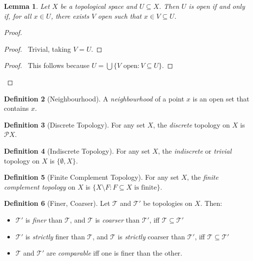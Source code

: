 \documentclass{book}
\newtheorem{lm}{Lemma}[chapter]
\theoremstyle{definition}
\newtheorem{df}[lm]{Definition}
\begin{document}
  \begin{lm}
    \label{lm:topology:open:membership}
    Let $X$ be a topological space and $U \subseteq X$. Then $U$ is open if and 
    only if, for all $x \in U$, there exists $V$ open such that $x \in V 
    \subseteq 
    U$.
  \end{lm}
  
  \begin{proof}
    \pf
    \begin{proof}
      \pf\ Trivial, taking $V = U$.
    \end{proof}
    \begin{proof}
      \pf\ This follows because $U = \bigcup \{ V \text{ open} : V \subseteq U 
      \}$.
    \end{proof}
  \end{proof}
  
  \begin{df}[Neighbourhood]
    A \emph{neighbourhood} of a point $x$ is an open set that contains $x$.
  \end{df}
  
  \begin{df}[Discrete Topology]
    For any set $X$, the \emph{discrete} topology on $X$ is $\mathcal{P} X$.
  \end{df}
  
  \begin{df}[Indiscrete Topology]
    For any set $X$, the \emph{indiscrete} or \emph{trivial} topology on $X$ is
    $\{ \emptyset, X \}$.
  \end{df}
  
  \begin{df}[Finite Complement Topology]
    For any set $X$, the \emph{finite complement topology} on $X$ is $\{ X
    \setminus F : F \subseteq X \text{ is finite} \}$.
  \end{df}
  
  \begin{df}[Finer, Coarser]
    Let $\mathcal{T}$ and $\mathcal{T}'$ be topologies on $X$. Then:
    \begin{itemize}
      \item
      $\mathcal{T}'$ is \emph{finer} than $\mathcal{T}$, and $\mathcal{T}$ is
      \emph{coarser} than $\mathcal{T}'$, iff $\mathcal{T} \subseteq 
      \mathcal{T}'$
      \item
      $\mathcal{T}'$ is \emph{strictly} finer than $\mathcal{T}$, and 
      $\mathcal{T}$
      is
      \emph{strictly} coarser than $\mathcal{T}'$, iff $\mathcal{T} \subseteq
      \mathcal{T}'$
      \item
      $\mathcal{T}$ and $\mathcal{T}'$ are \emph{comparable} iff one is finer 
      than
      the other.
    \end{itemize}
  \end{df}
  
\end{document}
